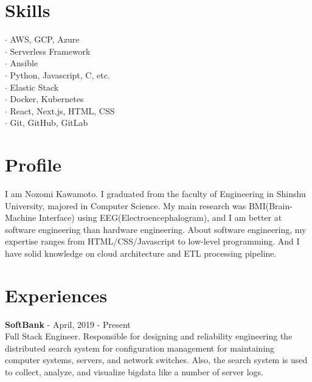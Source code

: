 \documentclass[11pt]{article} %
\begin{document}
\begin{paracol}{2}

\section{\Large Skills}
$\cdot$ AWS, GCP, Azure\\
$\cdot$ Serverless Framework\\
$\cdot$ Ansible\\
$\cdot$ Python, Javascript, C, etc.\\
$\cdot$ Elastic Stack\\
$\cdot$ Docker, Kubernetes\\
$\cdot$ React, Next.js, HTML, CSS\\
$\cdot$ Git, GitHub, GitLab\\

\switchcolumn %


\section{Profile}
I am Nozomi Kawamoto. I graduated from the faculty of Engineering in Shinshu University, majored in Computer Science. 
My main research was BMI(Brain-Machine Interface) using EEG(Electroencephalogram), and I am better at software engineering than hardware engineering.
About software engineering, my expertise ranges from HTML/CSS/Javascript to low-level programming. And I have solid knowledge on cloud architecture and ETL processing pipeline. 

\vspace{0.3cm}


\section{Experiences}
\textbf{\color{subtitle}SoftBank} \hspace{0.5mm} {\color{subtitle} - April, 2019 - Present}\\
Full Stack Engineer. Responsible for designing and reliability engineering the distributed search system 
for configuration management for maintaining computer systems, servers, and network switches. 
Also, the search system is used to collect, analyze, and visualize bigdata like a number of server logs.\\


\end{paracol}
\end{document}
